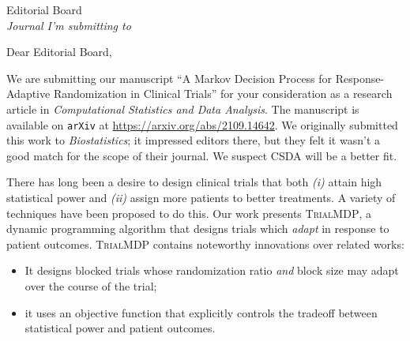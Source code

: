 \documentclass[12pt]{Myletter}
\date{\vspace{10mm} \today}
\makeatletter
\def\Where{\hspace{-1.2mm}\textbf{\color{UWred}
Department of Computer Sciences,\\ University of Wisconsin - Madison
}}
\def\Address{1210 W. Dayton Street}
\def\CityZip{Madison, Wisconsin, 53706}
\def\Email{\textbf{\color{UWred}E-mail}: dmerrell@cs.wisc.edu}
\def\URL{\textbf{\color{UWred}URL}: https://cs.wisc.edu}
\def\newaddress{
\Where\\ 
\Address\\ 
\CityZip\\ 
\Email\\ 
\URL 
}
\makeatother
\begin{document}
%
%
%
\begin{letter}{
               Editorial Board\\ 
               \textit{Journal I'm submitting to}
               }
%

%
\opening{Dear Editorial Board,}


%

We are submitting our manuscript ``A Markov Decision Process for Response-Adaptive Randomization in Clinical Trials'' for your consideration as a research article in \textit{Computational Statistics and Data Analysis}. 
The manuscript is available on \texttt{arXiv} at \href{https://arxiv.org/abs/2109.14642}{https://arxiv.org/abs/2109.14642}.
We originally submitted this work to \textit{Biostatistics}; 
it impressed editors there, but they felt it wasn't a good match for the scope of their journal. 
We suspect CSDA will be a better fit.

There has long been a desire to design clinical trials that both \textit{(i)} attain high statistical power and \textit{(ii)} assign more patients to better treatments.
A variety of techniques have been proposed to do this.
Our work presents \textsc{TrialMDP}, a dynamic programming algorithm that designs trials which \emph{adapt} in response to patient outcomes.
\textsc{TrialMDP} contains noteworthy innovations over related works:
\begin{itemize}
    \item It designs blocked trials whose randomization ratio \emph{and} block size may adapt over the course of the trial;
    \item it uses an objective function that explicitly controls the tradeoff between statistical power and patient outcomes.
\end{itemize}



\end{letter}
\end{document}
